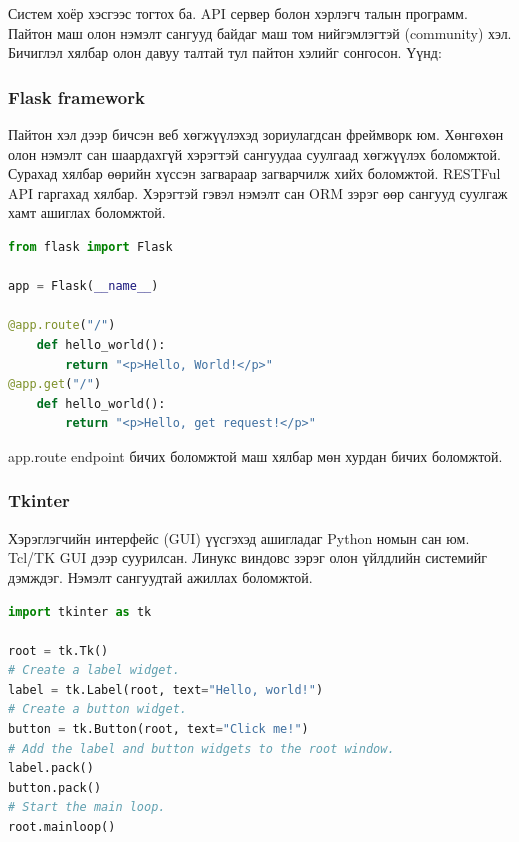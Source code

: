Систем хоёр хэсгээс тогтох ба. API сервер болон хэрлэгч талын программ. Пайтон маш олон нэмэлт сангууд байдаг маш том нийгэмлэгтэй (community) хэл. Бичиглэл хялбар олон давуу талтай тул пайтон хэлийг сонгосон.
Үүнд:
\subsubsection*{\textbf{Flask framework}}
Пайтон хэл дээр бичсэн веб хөгжүүлэхэд зориулагдсан  фреймворк юм. Хөнгөхөн олон нэмэлт сан шаардахгүй хэрэгтэй сангуудаа суулгаад хөгжүүлэх боломжтой. Сурахад хялбар өөрийн хүссэн загвараар загварчилж хийх боломжтой. RESTFul API гаргахад хялбар. Хэрэгтэй гэвэл нэмэлт сан ORM зэрэг өөр сангууд суулгаж хамт ашиглах боломжтой.

\begin{lstlisting}[language=Python, caption={Энгийн API үүсгэж буй код}, captionpos=b]
from flask import Flask

app = Flask(__name__)
        
@app.route("/")
    def hello_world():
        return "<p>Hello, World!</p>"
@app.get("/")
    def hello_world():
        return "<p>Hello, get request!</p>"
\end{lstlisting}
app.route endpoint бичих боломжтой маш хялбар мөн хурдан бичих боломжтой.

\subsubsection*{Tkinter}
Хэрэглэгчийн интерфейс (GUI) үүсгэхэд ашигладаг Python номын сан юм. Tcl/TK GUI дээр суурилсан. Линукс виндовс зэрэг олон үйлдлийн системийг дэмждэг. Нэмэлт сангуудтай ажиллах боломжтой.
\begin{lstlisting}[language=Python, caption={Энгийн цонх үүсгэж буй код}, captionpos=b]
import tkinter as tk

root = tk.Tk()
# Create a label widget.
label = tk.Label(root, text="Hello, world!")
# Create a button widget.
button = tk.Button(root, text="Click me!")
# Add the label and button widgets to the root window.
label.pack()
button.pack()
# Start the main loop.
root.mainloop()
\end{lstlisting}
